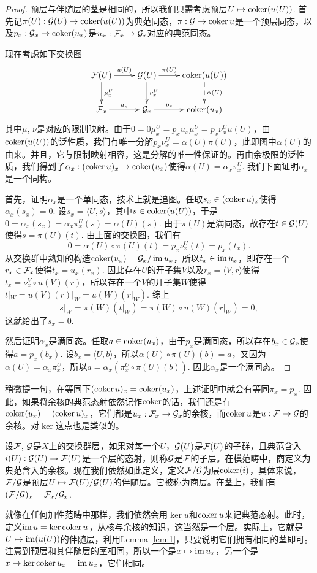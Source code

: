 \begin{proof}
预层与伴随层的茎是相同的，所以我们只需考虑预层$U\mapsto \operatorname{coker}(u(U))$. 首先记$\pi(U):\mathcal{G}(U)\to \operatorname{coker} (u(U))$为典范同态，$\pi:\mathcal{G}\to \operatorname{coker} u$是一个预层同态，以及$p_x:\mathcal{G}_x\to \operatorname{coker}(u_x)$是$u_x:\mathcal{F}_x\to\mathcal{G}_x$对应的典范同态。

现在考虑如下交换图
\[
	\xymatrix{
	\calf(U)\ar[r]^{u(U)}\ar[d]^{\mu^U_x}&\calg(U)\ar[r]^-{\pi(U)}\ar[d]^{\nu^U_x}&\coker (u(U))\ar@{-->}[d]^{\alpha(U)}\\
	\calf_x\ar[r]^{u_x}&\calg_x\ar[r]^-{p_x}&\coker (u_x)
	}
\]
其中$\mu$, $\nu$是对应的限制映射。由于$0=0\mu^U_x=p_xu_x\mu^U_x=p_x\nu^U_xu(U)$，由$\operatorname{coker}(u(U))$的泛性质，我们有唯一分解$p_x\nu^U_x=\alpha(U)\pi(U)$，此即图中$\alpha(U)$的由来。并且，它与限制映射相容，这是分解的唯一性保证的。再由余极限的泛性质，我们得到了$\alpha_x:(\operatorname{coker} u)_x\to \operatorname{coker} (u_x)$使得$\alpha(U)=\alpha_x\pi^U_x$. 我们下面证明$\alpha_x$是一个同构。

首先，证明$\alpha_x$是一个单同态，技术上就是追图。任取$s_x\in (\operatorname{coker} u)_x$使得$\alpha_x(s_x)=0$. 设$s_x=\langle U,s\rangle$，其中$s\in \operatorname{coker} (u(U))$，于是$0=\alpha_x(s_x)=\alpha_x \pi_x^U(s)=\alpha(U)(s)$. 由于$\pi(U)$是满同态，故存在$t\in \mathcal{G}(U)$使得$s=\pi(U)(t)$. 由上面的交换图，我们有
\[
	0=\alpha(U)\circ \pi(U)(t)=p_x\nu_x^U(t)=p_x(t_x).
\]
从交换群中熟知的构造$\operatorname{coker}(u_x)=\mathcal{G}_x/\operatorname{im} u_x$，所以$t_x\in \operatorname{im} u_x$，即存在一个$r_x\in \mathcal{F}_x$使得$t_x=u_x(r_x)$. 因此存在$U$的开子集$V$以及$r_x=\langle V,r\rangle$使得$t_x=\nu_x^V\circ u(V)(r)$，所以存在一个$V$的开子集$W$使得$t|_W=u(V)(r)|_W=u(W)(r|_W)$. 综上
\[
	s|_W=\pi(W)(t|_W)=\pi(W)\circ u(W)(r|_W)=0,
\]
这就给出了$s_x=0$.

然后证明$\alpha_x$是满同态。任取$a\in \operatorname{coker}(u_x)$，由于$p_x$是满同态，所以存在$b_x\in\mathcal{G}_x$使得$a=p_x(b_x)$. 设$b_x=\langle U,b\rangle$，所以$\alpha(U)\circ \pi(U)(b)=a$，又因为$\alpha(U)=\alpha_x\pi^U_x$，所以$a=\alpha_x\left(\pi^U_x\circ \pi(U)(b)\right)$. 因此$\alpha_x$是一个满同态。
\end{proof}

稍微提一句，在等同下$(\operatorname{coker} u)_x=\operatorname{coker}(u_x)$，上述证明中就会有等同$\pi_x=p_x$. 因此，如果将余核的典范态射依然记作$\operatorname{coker}$的话，我们还是有$\operatorname{coker}(u_x)=(\operatorname{coker} u)_x$，它们都是$u_x:\mathcal{F}_x\to\mathcal{G}_x$的余核，而$\operatorname{coker} u$是$u:\mathcal{F} \to \mathcal{G}$的余核。对$\ker$这点也是类似的。

\begin{para}[商层]\label{qsheaf}
设$\mathcal{F}$, $\mathcal{G}$是$X$上的交换群层，如果对每一个$U$，$\mathcal{G}(U)$是$\mathcal{F}(U)$的子群，且典范含入$i(U):\mathcal{G}(U)\to\mathcal{F}(U)$是一个层的态射，则称$\mathcal{G}$是$\mathcal{F}$的子层。在模范畴中，商定义为典范含入的余核。现在我们依然如此定义，定义$\mathcal{F}/\mathcal{G}$为层$\operatorname{coker}(i)$，具体来说，$\mathcal{F}/\mathcal{G}$是预层$U\mapsto \mathcal{F}(U)/\mathcal{G}(U)$的伴随层。它被称为商层。在茎上，我们有$(\mathcal{F}/\mathcal{G})_x=\mathcal{F}_x/\mathcal{G}_x$.

就像在任何加性范畴中那样，我们依然会用$\ker u$和$\operatorname{coker} u$来记典范态射。此时，定义$\operatorname{im} u=\ker\operatorname{coker} u$，从核与余核的知识，这当然是一个层。实际上，它就是$U\mapsto \operatorname{im}(u(U))$的伴随层，利用Lemma \ref{lem:1}，只要说明它们拥有相同的茎即可。注意到预层和其伴随层的茎相同，所以一个是$x\mapsto \operatorname{im} u_x$，另一个是$x\mapsto \ker\operatorname{coker} u_x=\operatorname{im} u_x$，它们相同。
\end{para}

